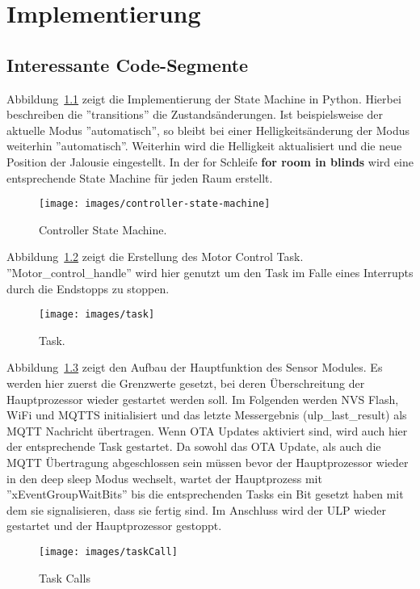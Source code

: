 \chapter{Implementierung}
\label{cha:Implementierung}

\section{Interessante Code-Segmente}

Abbildung~\ref{fig:controller-state-machine} zeigt die Implementierung der State Machine in Python. Hierbei beschreiben die ''transitions'' die Zustandsänderungen. Ist beispielsweise der aktuelle Modus ''automatisch'', so bleibt bei einer Helligkeitsänderung der Modus weiterhin ''automatisch''. Weiterhin wird die Helligkeit aktualisiert und die neue Position der Jalousie eingestellt.
In der for Schleife \textbf{for room in blinds} wird eine entsprechende State Machine für jeden Raum erstellt.
\begin{figure}[hbt]
	\centering
	\texttt{[image: images/controller-state-machine]}
	\caption[Code Segment Controller State Machine]{Controller State Machine.}
	\label{fig:controller-state-machine}
\end{figure}

Abbildung~\ref{fig:task} zeigt die Erstellung des Motor Control Task. ''Motor\_control\_handle'' wird hier genutzt um den Task im Falle eines Interrupts durch die Endstopps zu stoppen.
\begin{figure}[hbt]
	\centering
	\texttt{[image: images/task]}
	\caption[Code Segment Task]{Task.}
	\label{fig:task}
\end{figure}

Abbildung~\ref{fig:task-calls} zeigt den Aufbau der Hauptfunktion des Sensor Modules. Es werden hier zuerst die Grenzwerte gesetzt, bei deren Überschreitung der Hauptprozessor wieder gestartet werden soll. Im Folgenden werden NVS Flash, WiFi und MQTTS initialisiert und das letzte Messergebnis (ulp\_last\_result) als MQTT Nachricht übertragen. Wenn OTA Updates aktiviert sind, wird auch hier der entsprechende Task gestartet. Da sowohl das OTA Update, als auch die MQTT Übertragung abgeschlossen sein müssen bevor der Hauptprozessor wieder in den deep sleep Modus wechselt, wartet der Hauptprozess mit ''xEventGroupWaitBits'' bis die entsprechenden Tasks ein Bit gesetzt haben mit dem sie signalisieren, dass sie fertig sind. Im Anschluss wird der ULP wieder gestartet und der Hauptprozessor gestoppt.
\begin{figure}[hbt]
	\centering
	\texttt{[image: images/taskCall]}
	\caption[Code Segment Task Calls]{Task Calls}
	\label{fig:task-calls}
\end{figure}




